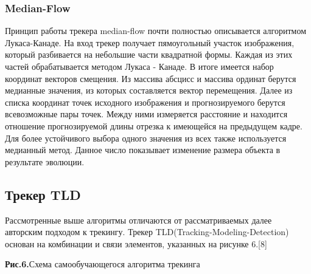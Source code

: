 \documentclass[a4paper,14pt]{extarticle}
\begin{document}
\subsubsection{Median-Flow}
Принцип работы трекера median-flow почти полностью описывается алгоритмом Лукаса-Канаде. На вход трекер получает пямоугольный участок изображения, который разбивается на небольшие части квадратной формы. Каждая из этих частей обрабатывается методом Лукаса - Канаде. В итоге имеется набор координат векторов смещения. Из массива абсцисс и массива ординат берутся медианные значения, из которых составляется вектор перемещения. Далее из списка координат точек исходного изображения и прогнозируемого берутся всевозможные пары точек. Между ними измеряется расстояние и находится отношение прогнозируемой длины отрезка к имеющейся на предыдущем кадре. Для более устойчивого выбора одного значения из всех также используется медианный метод. Данное число показывает изменение размера объекта в результате эволюции.


\subsection{Трекер TLD}

Рассмотренные выше алгоритмы отличаются от рассматриваемых далее авторским подходом к трекингу. Трекер TLD(Tracking-Modeling-Detection) основан на комбинации и связи элементов, указанных на рисунке 6.[8]

\begin{center}


\textbf{Рис.6.}Схема самообучающегося алгоритма трекинга
\end{center}
\end{document}
